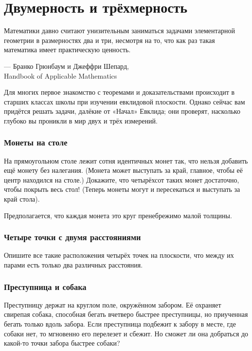 \chapter{Двумерность и трёхмерность}


\setlength{\epigraphwidth}{.83\textwidth}
\epigraph{Математики давно считают унизительным заниматься задачами элементарной геометрии в размерностях два и три, несмотря на то, что как раз такая математика имеет практическую ценность.}{--- Бранко Грюнбаум и Джеффри Шепард,\\ Handbook of Applicable Mathematics}

Для многих первое знакомство с теоремами и доказательствами
происходит в старших классах школы при изучении евклидовой плоскости.
Однако сейчас вам придётся решать задачи, далёкие от «Начал» Евклида;
они проверят, насколько глубоко вы проникли в мир двух и трёх измерений.

\subsection*{Монеты на столе}\label{Монеты на столе}

На прямоугольном столе лежит сотня идентичных монет так, что нельзя добавить ещё монету без налегания.
(Монета может выступать за край, главное, чтобы её центр находился на столе.)
Докажите, что четырёхсот таких монет достаточно, чтобы покрыть весь стол!
(Теперь монеты могут и пересекаться и выступать за край стола).

Предполагается, что каждая монета это круг пренебрежимо малой толщины.

\subsection*{Четыре точки с двумя расстояниями}

Опишите все такие расположения четырёх точек на плоскости, что между их парами есть только два различных расстояния.

\subsection*{Преступница и собака}

Преступницу держат на круглом  поле, окружённом забором.
Её охраняет свирепая собака, способная бегать вчетверо быстрее преступницы, но приученная бегать только вдоль забора.
Если преступница подбежит к забору в месте, где собаки нет, то мгновенно его перелезет и сбежит.
Но сможет ли она добраться до какой-то точки забора быстрее собаки?

